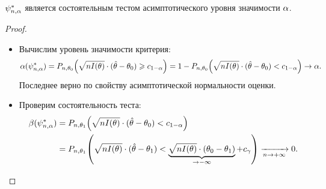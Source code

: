 \begin{theorem}
    $\psi^*_{n, \alpha}$ является состоятельным тестом асимптотического уровня 
    значимости $\alpha$.
\end{theorem}
\begin{proof}
    \enewline
    \begin{itemize}
        \item Вычислим уровень значимости критерия:
            \[
                \a(\psi^*_{n, \a}) = P_{n, \theta_0}\parens*{\sqrt{n I(\theta)} 
                \cdot (\hat{\theta} - \theta_0) \geqslant c_{1 - \a}} = 
                1 - P_{n, \theta_0}\parens*{\sqrt{n I(\theta)} 
                \cdot (\hat{\theta} - \theta_0) < c_{1 - \a}} \to \a
            .\]
            Последнее верно по свойству асимптотической нормальности оценки.
        \item Проверим состоятельность теста:
            \begin{align*}
                \b(\psi^*_{n, \a}) 
                &= P_{n, \theta_1}\parens*{\sqrt{n I(\theta)} 
                \cdot (\hat{\theta} - \theta_0) < c_{1 - \a}} \\ 
                &= P_{n, \theta_1}\parens*{\sqrt{n I(\theta)} \cdot
                    (\hat{\theta} - \theta_1) < \underbrace{\sqrt{n I(\theta)} 
                \cdot (\theta_0 - \theta_1)}_{\to -\infty} + c_\gamma}
                \xrightarrow[n \to +\infty]{} 0
            .\end{align*}
    \end{itemize}
\end{proof}

